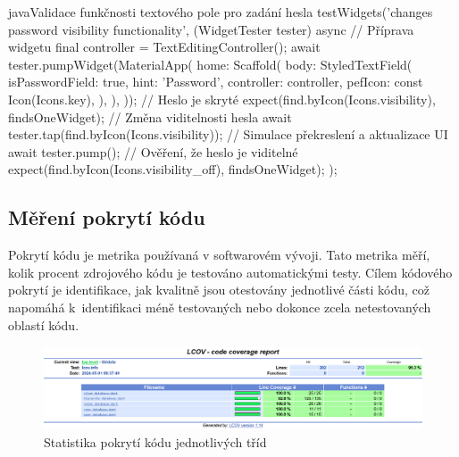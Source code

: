 \documentclass[czech, bc, kiv, he, iso690numb]{fasthesis}
\begin{document}
\begin{code}{java}{Validace funkčnosti textového pole pro zadání hesla \label{code:widget-test}}
    testWidgets('changes password visibility functionality', (WidgetTester tester) async {
      // Příprava widgetu 
      final controller = TextEditingController();
      await tester.pumpWidget(MaterialApp(
        home: Scaffold(
          body: StyledTextField(
            isPasswordField: true,
            hint: 'Password',
            controller: controller,
            pefIcon: const Icon(Icons.key),
          ),
        ),
      ));
      // Heslo je skryté
      expect(find.byIcon(Icons.visibility), findsOneWidget);
      // Změna viditelnosti hesla
      await tester.tap(find.byIcon(Icons.visibility));
      // Simulace překreslení a aktualizace UI
      await tester.pump();
      // Ověření, že heslo je viditelné
      expect(find.byIcon(Icons.visibility_off), findsOneWidget);
    });
\end{code}






\subsection{Měření pokrytí kódu}\label{sec:coverage}

Pokrytí kódu je metrika používaná v softwarovém vývoji. Tato metrika měří, kolik procent zdrojového kódu je testováno automatickými testy. Cílem kódového pokrytí je identifikace, jak kvalitně jsou otestovány jednotlivé části kódu, což napomáhá k~identifikaci méně testovaných nebo dokonce zcela netestovaných oblastí kódu.

\begin{figure}[h!]
  \centering
  \includegraphics[width=1\textwidth]{img/BP-Runt/Testing/coverage-local-database.png}
  \caption{Statistika pokrytí kódu jednotlivých tříd}
  \label{fig:coverage-report}
\end{figure}
\end{document}
